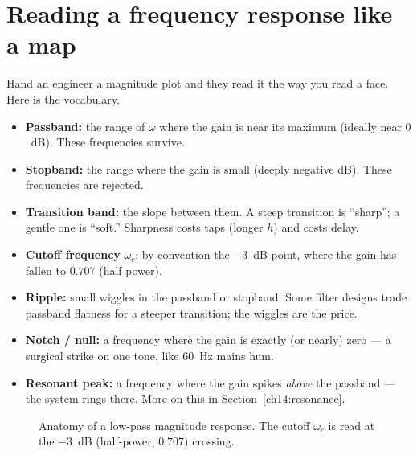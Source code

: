 \section{Reading a frequency response like a map}
\label{ch14:reading}

Hand an engineer a magnitude plot and they read it the way you read a face. Here
is the vocabulary.

\begin{itemize}
  \item \textbf{Passband:} the range of $\omega$ where the gain is near its
  maximum (ideally near $0$~dB). These frequencies survive.
  \item \textbf{Stopband:} the range where the gain is small (deeply negative
  dB). These frequencies are rejected.
  \item \textbf{Transition band:} the slope between them. A steep transition is
  ``sharp''; a gentle one is ``soft.'' Sharpness costs taps (longer $h$) and
  costs delay.
  \item \textbf{Cutoff frequency} $\omega_c$: by convention the $-3$~dB point,
  where the gain has fallen to $0.707$ (half power).
  \item \textbf{Ripple:} small wiggles in the passband or stopband. Some filter
  designs trade passband flatness for a steeper transition; the wiggles are the
  price.
  \item \textbf{Notch / null:} a frequency where the gain is exactly (or nearly)
  zero --- a surgical strike on one tone, like 60~Hz mains hum.
  \item \textbf{Resonant peak:} a frequency where the gain spikes \emph{above}
  the passband --- the system rings there. More on this in
  Section~\ref{ch14:resonance}.
\end{itemize}

\begin{figure}[H]
\centering
{}
\caption{Anatomy of a low-pass magnitude response. The cutoff $\omega_c$ is read
at the $-3$~dB (half-power, $0.707$) crossing.}
\label{ch14:fig-anatomy}
\end{figure}

